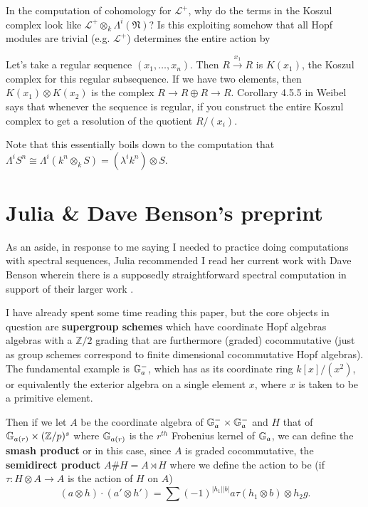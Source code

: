 \documentclass[12pt]{article}
\theoremstyle{nonumberbreak}
\theoremstyle{changebreak}
\theoremstyle{nonumberplain}
\theoremstyle{change}
\newcommand*{\bbZ}{\mathbb{Z}}
\newcommand*{\bbG}{\ensuremath\mathbb{G}}
\begin{document}
\begin{qst}
	In the computation of cohomology for $\mathcal L^+$, why do the terms in the Koszul complex
	look like $\mathcal L^+\otimes_k \Lambda^i(\mathfrak N)$? Is this exploiting somehow that 
	all Hopf modules are trivial (e.g. $\mathcal L^+$) determines the entire action by 
\end{qst}

Let's take a regular sequence $(x_1,\dots,x_n)$. Then $R\xrightarrow{x_1} R$ is $K(x_1)$, the 
Koszul complex for this regular subsequence. If we have two elements, then $K(x_1)\otimes K(x_2)$
is the complex $R\to R\oplus R\to R$. Corollary 4.5.5 in Weibel says that whenever the sequence is regular, if you 
construct the entire Koszul complex to get a resolution of the quotient $R/(x_i)$.

Note that this essentially boils down to the computation that $\Lambda^iS^n\cong \Lambda^i(k^n\otimes_k S)=(\lambda^i k^n)\otimes S$.



\newpage
\section{Julia \& Dave Benson's preprint}
As an aside, in response to me saying I needed to practice doing computations with spectral sequences,
Julia recommended I read her current work \cite{julia-dave} with Dave Benson wherein there is a supposedly
straightforward spectral computation in support of their larger work \cite{detecting-nilpotence}.

I have already spent some time reading this paper, but the core objects in question are \textbf{supergroup schemes}
which have coordinate Hopf algebras algebras with a $\bbZ/2$ grading that are furthermore (graded) cocommutative (just 
as group schemes correspond to finite dimensional cocommutative Hopf algebras). The fundamental example is $\bbG_a^-$,
which has as its coordinate ring $k[x]/(x^2)$, or equivalently the exterior algebra on a single element $x$,
where $x$ is taken to be a primitive element.

Then if we let $A$ be the coordinate algebra of $\bbG_a^-\times\bbG_a^-$ and $H$ that of $\bbG_{a(r)}\times(\bbZ/p)^s$ where $\bbG_{a(r)}$ is the
$r^{th}$ Frobenius kernel of $\bbG_a$, we can define the \textbf{smash product} or in this case, since 
$A$ is graded cocommutative, the \textbf{semidirect product} $A\#H=A\rtimes H$ where we define the action
to be (if $\tau:H\otimes A\to A$ is the action of $H$ on $A$)
\[(a\otimes h)\cdot(a'\otimes h')=\sum (-1)^{|h_1||b|}a\tau(h_1\otimes b)\otimes h_2g.\]
\end{document}
